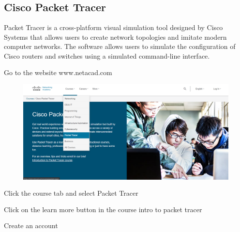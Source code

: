 \documentclass[12pt,a4paper]{article}
\begin{document}
\subsection{Cisco Packet Tracer}
Packet Tracer is a cross-platform visual simulation tool designed by Cisco Systems that allows users to create network topologies and imitate modern computer networks. The software allows users to simulate the configuration of Cisco routers and switches using a simulated command-line interface.
\begin{steps}
  \item Go to the website www.netacad.com
\begin{figure}[h]
 		\centering
				\includegraphics[scale=0.20]{2.1.png}	
	\end{figure}
  \item Click the course tab and select Packet Tracer

  \item Click on the learn more button in  the course intro to packet tracer
	

\item Create an account 


\end{steps}
\end{document}
